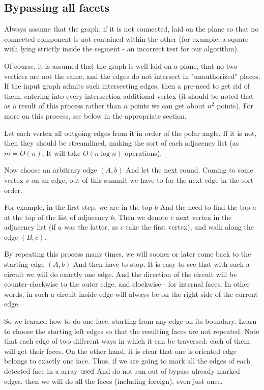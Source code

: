 \subsection{ Bypassing all facets }

Always assume that the graph, if it is not connected, laid on the plane so that no connected component is not contained within the other (for example, a square with lying strictly inside the segment - an incorrect test for our algorithm).

Of course, it is assumed that the graph is well laid on a plane, that no two vertices are not the same, and the edges do not intersect in "unauthorized" places. If the input graph admits such intersecting edges, then a pre-need to get rid of them, entering into every intersection additional vertex (it should be noted that as a result of this process rather than $n$ points we can get about $n ^ 2$ points). For more on this process, see below in the appropriate section.

Let each vertex all outgoing edges from it in order of the polar angle. If it is not, then they should be streamlined, making the sort of each adjacency list (as $m = O (n)$, It will take $O (n \log n)$ operations).

Now choose an arbitrary edge $(A, b)$ And let the next round. Coming to some vertex $v$ on an edge, out of this summit we have to for the next edge in the sort order.

For example, in the first step, we are in the top $b$ And the need to find the top $a$ at the top of the list of adjacency $b$, Then we denote $c$ next vertex in the adjacency list (if $a$ was the latter, as $c$ take the first vertex), and walk along the edge $(B, c)$.

By repeating this process many times, we will sooner or later come back to the starting edge $(A, b)$ And then have to stop. It is easy to see that with such a circuit we will do exactly one edge. And the direction of the circuit will be counter-clockwise to the outer edge, and clockwise - for internal faces. In other words, in such a circuit inside edge will always be on the right side of the current edge.

So we learned how to do one face, starting from any edge on its boundary. Learn to choose the starting left edges so that the resulting faces are not repeated. Note that each edge of two different ways in which it can be traversed: each of them will get their faces. On the other hand, it is clear that one is oriented edge belongs to exactly one face. Thus, if we are going to mark all the edges of each detected face in a array $\rm used$ And do not run out of bypass already marked edges, then we will do all the faces (including foreign), even just once.

